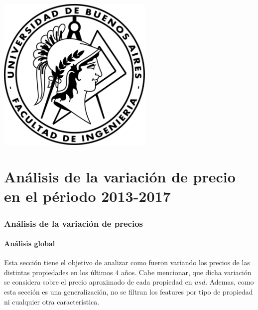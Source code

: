 \documentclass[a4paper, 10pt]{article}
\newcommand\tab[1][0.5cm]{\hspace*{#1}}
\begin{document}
    \newpage

    \begin{center}
        \includegraphics[width=7.5cm, height=7.5cm]{images/logo}
    \end{center}


    \maketitle
    \newpage
    \tableofcontents
    \newpage
	\part{Análisis de la variación de precio en el périodo 2013-2017}

		\section{Análisis de la variación de precios}

      \subsection{Análisis global}

        \tab Esta sección tiene el objetivo de analizar como fueron variando los precios de las distintas propiedades en los últimos 4 años.
        Cabe mencionar, que dicha variación se considera sobre el precio aproximado de cada propiedad en $usd$. Ademas, como esta sección es una generalización, no se filtran los features por tipo de propiedad ni cualquier otra  característica.
\end{document}
